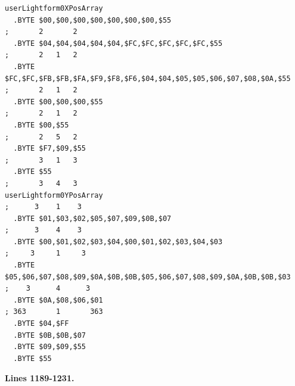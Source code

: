 \begin{minipage}[b]{0.48\linewidth}
\begin{lrbox}{\mybox}%
\begin{lstlisting}[basicstyle=\ttfamily\tiny,escapechar=\%]
userLightform0XPosArray
  .BYTE $00,$00,$00,$00,$00,$00,$00,$55                                        ;       2       2      
  .BYTE $04,$04,$04,$04,$04,$FC,$FC,$FC,$FC,$FC,$55                            ;       2   1   2      
  .BYTE $FC,$FC,$FB,$FB,$FA,$F9,$F8,$F6,$04,$04,$05,$05,$06,$07,$08,$0A,$55    ;       2   1   2      
  .BYTE $00,$00,$00,$55                                                        ;       2   1   2      
  .BYTE $00,$55                                                                ;       2   5   2      
  .BYTE $F7,$09,$55                                                            ;       3   1   3      
  .BYTE $55                                                                    ;       3   4   3      
userLightform0YPosArray                                                        ;      3    1    3     
  .BYTE $01,$03,$02,$05,$07,$09,$0B,$07                                        ;      3    4    3     
  .BYTE $00,$01,$02,$03,$04,$00,$01,$02,$03,$04,$03                            ;     3     1     3    
  .BYTE $05,$06,$07,$08,$09,$0A,$0B,$0B,$05,$06,$07,$08,$09,$0A,$0B,$0B,$03    ;    3      4      3   
  .BYTE $0A,$08,$06,$01                                                        ; 363       1       363
  .BYTE $04,$FF
  .BYTE $0B,$0B,$07
  .BYTE $09,$09,$55                                                         
  .BYTE $55
\end{lstlisting}
\end{lrbox}%
\scalebox{0.8}{\usebox{\mybox}}

\end{minipage}
%
\clearpage
\textbf{Lines 1189-1231. } 
